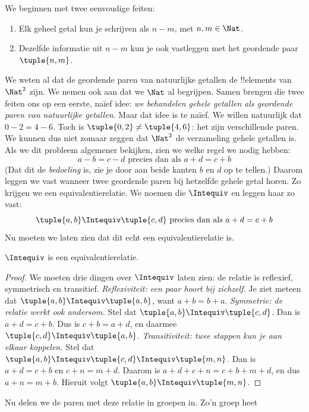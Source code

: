\documentclass[openany]{memoir}
\begin{document}
We beginnen met twee eenvoudige feiten:
	\begin{enumerate}
		\item Elk geheel getal kun je schrijven als $n - m$, met $n, m \in\Nat$.
		\item Dezelfde informatie uit $n - m$ kun je ook vastleggen met het geordende paar $\tuple{n, m}$.
	\end{enumerate}
We weten al dat de geordende paren van natuurlijke getallen de !!{element}s
van $\Nat^2$ zijn. We nemen ook aan dat we $\Nat$ al begrijpen. Samen
brengen die twee feiten ons op een eerste, na\"{i}ef idee: \emph{we behandelen gehele
getallen als geordende paren van natuurlijke getallen}.
Maar dat idee is te na\"{i}ef. We willen natuurlijk dat $0- 2 = 4 -
6$. Toch is $\tuple{0, 2 }\neq \tuple{4, 6}$: het zijn verschillende
paren. We kunnen dus niet zomaar zeggen dat $\Nat^2$ de verzameling
gehele getallen is.
Als we dit probleem algemener bekijken, zien we welke regel we nodig hebben:
	$$a - b = c - d \text{ precies dan als }a + d = c + b$$
(Dat dit de \emph{bedoeling} is, zie je door aan beide kanten $b$ en $d$ op
te tellen.) Daarom leggen we vast wanneer twee geordende paren bij
hetzelfde gehele getal horen. Zo krijgen we een equivalentierelatie. We noemen
die $\Intequiv$ en leggen haar zo vast:
$$\tuple{ a, b } \Intequiv \tuple{c, d}\text{ precies dan als }a + d = c + b$$
Nu moeten we laten zien dat dit echt een equivalentierelatie is.
\begin{prop} $\Intequiv$ is een equivalentierelatie.
\end{prop}
	\begin{proof}
	We moeten drie dingen over $\Intequiv$ laten zien: de relatie is
	reflexief, symmetrisch en transitief.
	\emph{Reflexiviteit: een paar hoort bij zichzelf.} Je ziet meteen dat
	$\tuple{a, b} \Intequiv \tuple{a, b}$, want $a + b = b + a$.
	\emph{Symmetrie: de relatie werkt ook andersom.} Stel dat $\tuple{a,
	b} \Intequiv \tuple{c, d}$. Dan is $a + d = c + b$. Dus is $c + b =
	a + d$, en daarmee $\tuple{c, d} \Intequiv \tuple{a, b}$.
	\emph{Transitiviteit: twee stappen kun je aan elkaar koppelen.} Stel
	dat $\tuple{a, b} \Intequiv \tuple{c, d}\Intequiv \tuple{m, n}$.
	Dan is $a + d = c + b$ en $c + n = m + d$. Daarom is $a + d + c +
	n = c + b + m + d$, en dus $a + n = m + b$. Hieruit volgt
	$\tuple{a, b } \Intequiv \tuple{m, n}$.
\end{proof}
Nu delen we de paren met deze relatie in groepen in. Zo'n groep heet
\end{document}
